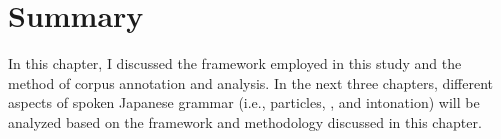 




%


\section{Summary}

In this chapter,
I discussed
the framework employed in this study and
the method of corpus annotation and analysis.
In the next three chapters,
different aspects of spoken Japanese grammar (i.e., particles, , and intonation) will be analyzed based on the framework and methodology discussed in this chapter.








